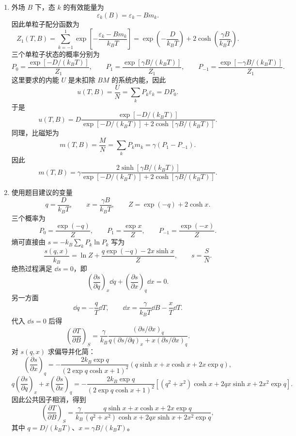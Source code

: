 \begin{question}[25 分]
\begin{solution}
\begin{enumerate}
    \item 外场 $B$ 下，态 $k$ 的有效能量为
    \[
        \varepsilon_k(B)=\varepsilon_k-Bm_k.
    \]
    因此单粒子配分函数为
    \[
        Z_1(T,B)=\sum_{k=-1}^{1}\exp\left[-\frac{\varepsilon_k-Bm_k}{k_BT}\right]
        =\exp\left(-\frac{D}{k_BT}\right)+2\cosh\left(\frac{\gamma B}{k_BT}\right).
    \]
    三个单粒子状态的概率分别为
    \[
        P_0=\frac{\exp[-D/(k_BT)]}{Z_1},
        \qquad
        P_1=\frac{\exp[\gamma B/(k_BT)]}{Z_1},
        \qquad
        P_{-1}=\frac{\exp[-\gamma B/(k_BT)]}{Z_1}.
    \]
    这里要求的内能 $U$ 是未扣除 $BM$ 的系统内能，因此
    \[
        u(T,B)=\frac{U}{N}=\sum_kP_k\varepsilon_k=DP_0.
    \]
    于是
    \[
        \boxed{
        u(T,B)=D\frac{\exp[-D/(k_BT)]}{\exp[-D/(k_BT)]+2\cosh[\gamma B/(k_BT)]}.}
    \]
    同理，比磁矩为
    \[
        m(T,B)=\frac{M}{N}=\sum_kP_km_k=\gamma(P_1-P_{-1}).
    \]
    因此
    \[
        \boxed{
        m(T,B)=\gamma\frac{2\sinh[\gamma B/(k_BT)]}{\exp[-D/(k_BT)]+2\cosh[\gamma B/(k_BT)]}.}
    \]

    \item 使用题目建议的变量
    \[
        q=\frac{D}{k_BT},
        \qquad
        x=\frac{\gamma B}{k_BT},
        \qquad
        Z=\exp(-q)+2\cosh x.
    \]
    三个概率为
    \[
        P_0=\frac{\exp(-q)}{Z},
        \qquad
        P_1=\frac{\exp x}{Z},
        \qquad
        P_{-1}=\frac{\exp(-x)}{Z}.
    \]
    熵可直接由 $s=-k_B\sum_kP_k\ln P_k$ 写为
    \[
        \frac{s(q,x)}{k_B}=\ln Z+\frac{q\exp(-q)-2x\sinh x}{Z},
        \qquad s=\frac{S}{N}.
    \]
    绝热过程满足 $\dd{s}=0$，即
    \[
        \left(\frac{\partial s}{\partial q}\right)_x\dd{q}
        +\left(\frac{\partial s}{\partial x}\right)_q\dd{x}=0.
    \]
    另一方面
    \[
        \dd{q}=-\frac{q}{T}\dd{T},
        \qquad
        \dd{x}=\frac{\gamma}{k_BT}\dd{B}-\frac{x}{T}\dd{T}.
    \]
    代入 $\dd{s}=0$ 后得
    \[
        \left(\frac{\partial T}{\partial B}\right)_S
        =\frac{\gamma}{k_B}
        \frac{(\partial s/\partial x)_q}{q(\partial s/\partial q)_x+x(\partial s/\partial x)_q}.
    \]
    对 $s(q,x)$ 求偏导并化简：
    \[
        \left(\frac{\partial s}{\partial x}\right)_q
        =-\frac{2k_B\exp q}{(2\exp q\cosh x+1)^2}
        \left(q\sinh x+x\cosh x+2x\exp q\right),
    \]
    \[
        q\left(\frac{\partial s}{\partial q}\right)_x+x\left(\frac{\partial s}{\partial x}\right)_q
        =-\frac{2k_B\exp q}{(2\exp q\cosh x+1)^2}
        \left[(q^2+x^2)\cosh x+2qx\sinh x+2x^2\exp q\right].
    \]
    因此公共因子相消，得到
    \[
        \boxed{
        \left(\frac{\partial T}{\partial B}\right)_S
        =\frac{\gamma}{k_B}
        \frac{q\sinh x+x\cosh x+2x\exp q}
        {(q^2+x^2)\cosh x+2qx\sinh x+2x^2\exp q},}
    \]
    其中 $q=D/(k_BT)$、$x=\gamma B/(k_BT)$。
\end{enumerate}
\end{solution}
\end{question}
